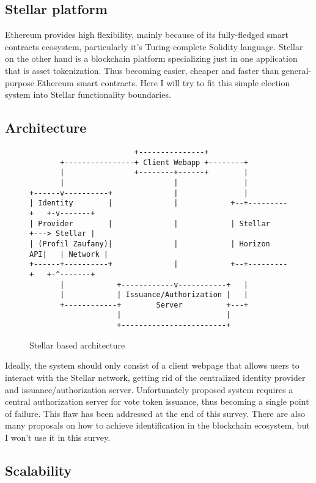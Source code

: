 \documentclass[runningheads]{llncs}
\begin{document}
\subsection{Stellar platform}
Ethereum provides high flexibility, mainly because of its fully-fledged smart contracts ecosystem, particularly it’s Turing-complete Solidity language. Stellar on the other hand is a blockchain platform specializing just in one application that is asset tokenization. Thus becoming easier, cheaper and faster than general-purpose Ethereum smart contracts. Here I will try to fit this simple election system into Stellar functionality boundaries.


\subsection{Architecture}
\begin{figure}
\begin{verbatim}
                        +---------------+
       +----------------+ Client Webapp +--------+
       |                +--------+------+        |
       |                         |               |
+------v----------+              |               |
| Identity        |              |            +--+---------+   +-v-------+
| Provider        |              |            | Stellar    +---> Stellar |
| (Profil Zaufany)|              |            | Horizon API|   | Network |
+------+----------+              |            +--+---------+   +-^-------+
       |            +------------v-----------+   |
       |            | Issuance/Authorization |   |
       +------------+        Server          +---+
                    |                        |
                    +------------------------+
\end{verbatim}
\caption{Stellar based architecture}
\label{fig:ascii-box}
\end{figure} 

Ideally, the system should only consist of a client webpage that allows users to interact with the Stellar network, getting rid of the centralized identity provider and issuance/authorization server. Unfortunately proposed system requires a central authorization server for vote token issuance, thus becoming a single point
of failure. This flaw has been addressed at the end of this survey. There are also many proposals on how to achieve identification in the blockchain ecosystem, but I won’t use it in this survey.

\subsection{Scalability}
\end{document}
